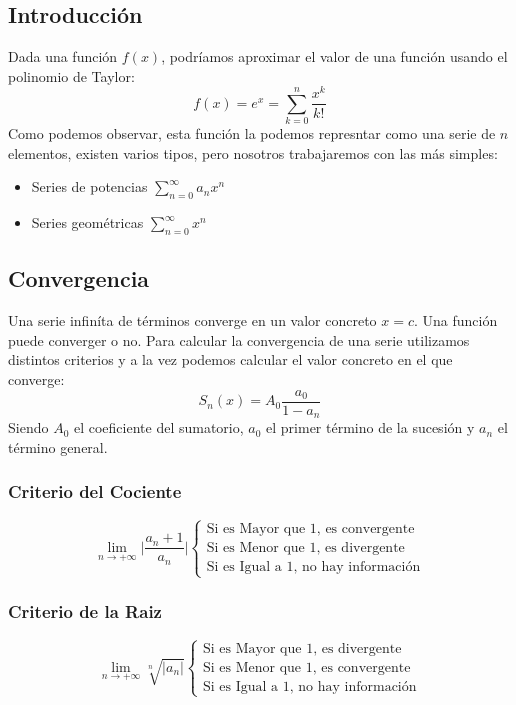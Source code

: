 \subsection{Introducción}
\noindent Dada una función \(f(x)\), podríamos aproximar el valor de una función usando el polinomio de Taylor:
\[
        f(x) = e^x =\sum^n_{k=0} \frac{x^k}{k!}
\]
\noindent Como podemos observar, esta función la podemos represntar como una serie de \(n\) elementos, existen varios tipos, pero nosotros trabajaremos con las más simples:
\begin{itemize}
        \item Series de potencias \(\sum^{\infty}_{n=0} a_n x^n\)
        \item Series geométricas \(\sum^{\infty}_{n=0} x^n\)
\end{itemize}
\subsection{Convergencia}
\noindent Una serie infiníta de términos converge en un valor concreto \(x = c\). Una función puede converger o no. Para calcular la convergencia de una serie utilizamos distintos criterios y a la vez podemos calcular el valor concreto en el que converge:
\[
        \boxed{S_n(x) =A_0 \frac{a_0}{1-a_n}}
\]
\noindent Siendo \(A_0\) el coeficiente del sumatorio, \(a_0\) el primer término de la sucesión y \(a_n\) el término general.
\subsubsection{Criterio del Cociente}
\[
        \boxed{\lim_{n \rightarrow + \infty} \Big |\frac{a_n + 1}{a_n} \Big|
                \begin{cases}
                        \text{Si es Mayor que 1, es convergente} \\
                        \text{Si es Menor que 1, es divergente}  \\
                        \text{Si es Igual a 1, no hay información}
                \end{cases}
        }
\]
\subsubsection{Criterio de la Raiz}
\[
        \boxed{\lim_{n \rightarrow + \infty} \sqrt[n]{\Big |a_n \Big|}
                \begin{cases}
                        \text{Si es Mayor que 1, es divergente}  \\
                        \text{Si es Menor que 1, es convergente} \\
                        \text{Si es Igual a 1, no hay información}
                \end{cases}
        }
\]
